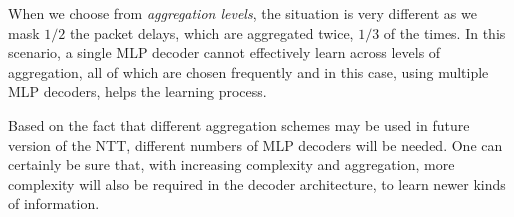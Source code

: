 When we choose from \emph{aggregation levels}, the situation is very different as we mask $1/2$ the packet delays, which are aggregated twice, $1/3$ of the times. In this scenario, a single MLP decoder cannot effectively learn across levels of aggregation, all of which are chosen frequently and in this case, using multiple MLP decoders, helps the learning process. 

Based on the fact that different aggregation schemes may be used in future version of the NTT, different numbers of MLP decoders will be needed. One can certainly be sure that, with increasing complexity and aggregation, more complexity will also be required in the decoder architecture, to learn newer kinds of information.

